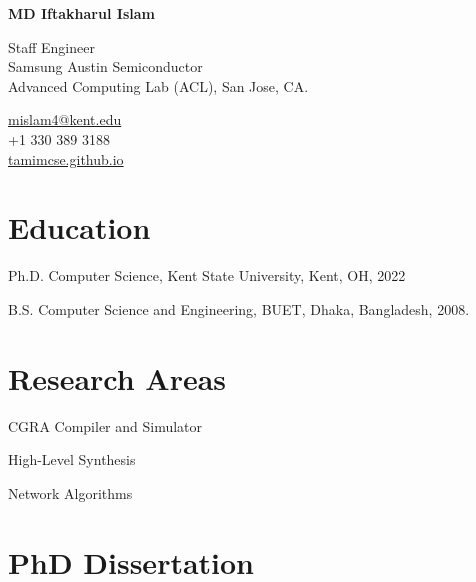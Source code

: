 \documentclass[11pt,letterpaper]{report}
\newcommand{\myname}{MD Iftakharul Islam}
\newcommand{\namefont}[1]{{\normalfont\bfseries\Huge{#1}}}
\newcommand{\listitemspace}{0.25em}
\renewenvironment{itemize}
{\begin{list}{}{\setlength{\leftmargin}{0em}
                \setlength{\parskip}{0em}
                \setlength{\itemsep}{\listitemspace}
                \setlength{\parsep}{\listitemspace}}}
{\end{list}}
\begin{document}
    \raggedright{}

    \namefont{\myname}

    \vspace{1em}
    \begin{minipage}[t]{0.700\textwidth}
        Staff Engineer \\
        Samsung Austin Semiconductor \\
        Advanced Computing Lab (ACL), San Jose, CA.
    \end{minipage}
    \begin{minipage}[t]{0.295\textwidth}
        \flushright{}
        \href{mailto:mislam4@kent.edu}{mislam4@kent.edu} \\
        +1 330 389 3188 \\
        \href{https://tamimcse.github.io/}{tamimcse.github.io}
    \end{minipage}


    \section*{Education}

    \begin{tablist}

        \item[Ph.D.] \tab{}Computer Science, Kent State University, Kent, OH, 2022
        \item[B.S.]  \tab{}Computer Science and Engineering, BUET, Dhaka, Bangladesh, 2008.

    \end{tablist}


    \section*{Research Areas}

    \begin{itemize}

        \item CGRA Compiler and Simulator
        \item High-Level Synthesis
        \item Network Algorithms

    \end{itemize}

    \section*{PhD Dissertation}
\end{document}
